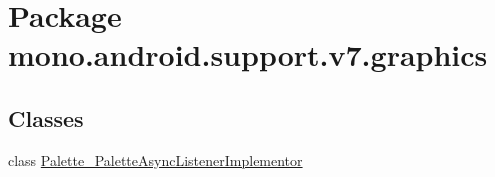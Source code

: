 \hypertarget{namespacemono_1_1android_1_1support_1_1v7_1_1graphics}{
\section{Package mono.android.support.v7.graphics}
\label{namespacemono_1_1android_1_1support_1_1v7_1_1graphics}
}
\subsection*{Classes}
\begin{CompactItemize}
\item 
class \hyperlink{classmono_1_1android_1_1support_1_1v7_1_1graphics_1_1_palette___palette_async_listener_implementor}{Palette\_\-PaletteAsyncListenerImplementor}
\end{CompactItemize}
